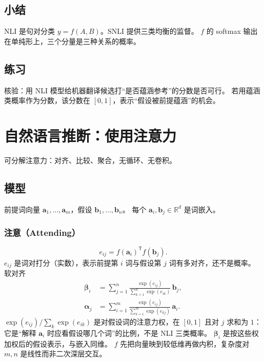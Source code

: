 \subsection{小结}

NLI 是句对分类 $y=f(A,B)$。SNLI 提供三类均衡的监督。
$f$ 的 softmax 输出在单纯形上，三个分量是三种关系的概率。

\subsection{练习}

核验：用 NLI 模型给机器翻译候选打“是否蕴涵参考”的分数是否可行。
若用蕴涵类概率作为分数，该分数在 $[0,1]$，表示“假设被前提蕴涵”的机会。

\section{自然语言推断：使用注意力}




可分解注意力：对齐、比较、聚合，无循环、无卷积。

\subsection{模型}

前提词向量 $\bm{a}_1,\ldots,\bm{a}_m$，假设 $\bm{b}_1,\ldots,\bm{b}_n$。
每个 $\bm{a}_i,\bm{b}_j\in\mathbb{R}^{d}$ 是词嵌入。

\subsubsection{注意（Attending）}

\[
e_{ij}=f(\bm{a}_i)^{\mathsf T}f(\bm{b}_j).
\]
$e_{ij}$ 是词对打分（实数），表示前提第 $i$ 词与假设第 $j$ 词有多对齐，还不是概率。
软对齐
\begin{align*}
\bm{\beta}_i
&=
\sum_{j=1}^{n}
\frac{\exp(e_{ij})}{\sum_{k=1}^{n}\exp(e_{ik})}\,\bm{b}_j,
\\
\bm{\alpha}_j
&=
\sum_{i=1}^{m}
\frac{\exp(e_{ij})}{\sum_{k=1}^{m}\exp(e_{kj})}\,\bm{a}_i.
\end{align*}
$\exp(e_{ij})/\sum_k\exp(e_{ik})$ 是对假设词的注意力权，在 $[0,1]$ 且对 $j$ 求和为 $1$：
它是“解释 $\bm{a}_i$ 时应看假设哪几个词”的比例，不是 NLI 三类概率。
$\bm{\beta}_i$ 是按这些权加权后的假设表示，与嵌入同维。
$f$ 先把向量映到较低维再做内积，复杂度对 $m,n$ 是线性而非二次深层交互。

